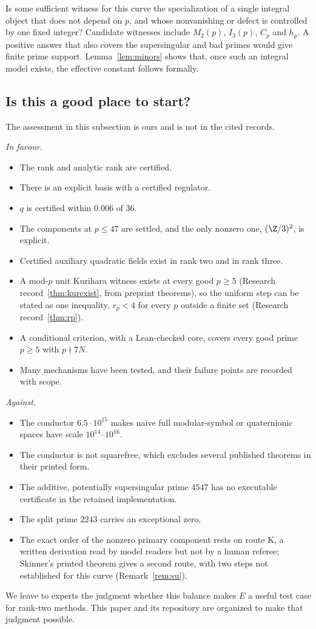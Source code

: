 \begin{question}[\cid{O.4}]\label{q:uniform}
Is some sufficient witness for this curve the specialization of a single integral object that does not depend on $p$, and whose nonvanishing or defect is controlled by one fixed integer? Candidate witnesses include $M_2(p)$, $I_3(p)$, $C_p$ and $h_p$. A positive answer that also covers the supersingular and bad primes would give finite prime support. Lemma~\ref{lem:minors} shows that, once such an integral model exists, the effective constant follows formally.
\end{question}

\subsection{Is this a good place to start?}
The assessment in this subsection is ours and is not in the cited records.

\emph{In favour.}
\begin{itemize}[leftmargin=*]
\item The rank and analytic rank are certified.
\item There is an explicit basis with a certified regulator.
\item $q$ is certified within $0.006$ of $36$.
\item The components at $p\le47$ are settled, and the only nonzero one, $(\Z/3)^2$, is explicit.
\item Certified auxiliary quadratic fields exist in rank two and in rank three.
\item A mod-$p$ unit Kurihara witness exists at every good $p\ge5$ (Research record~\ref{thm:kurexist}, from preprint theorems), so the uniform step can be stated as one inequality, $r_p<4$ for every $p$ outside a finite set (Research record~\ref{thm:rp}).
\item A conditional criterion, with a Lean-checked core, covers every good prime $p\ge5$ with $p\nmid7N$.
\item Many mechanisms have been tested, and their failure points are recorded with scope.
\end{itemize}

\emph{Against.}
\begin{itemize}[leftmargin=*]
\item The conductor $6.5\cdot10^{15}$ makes naive full modular-symbol or quaternionic spaces have scale $10^{14}$--$10^{16}$.
\item The conductor is not squarefree, which excludes several published theorems in their printed form.
\item The additive, potentially supersingular prime $4547$ has no executable certificate in the retained implementation.
\item The split prime $2243$ carries an exceptional zero.
\item The exact order of the nonzero primary component rests on route K, a written derivation read by model readers but not by a human referee; Skinner's printed theorem gives a second route, with two steps not established for this curve (Remark~\ref{rem:su}).
\end{itemize}

We leave to experts the judgment whether this balance makes $E$ a useful test case for rank-two methods. This paper and its repository are organized to make that judgment possible.

